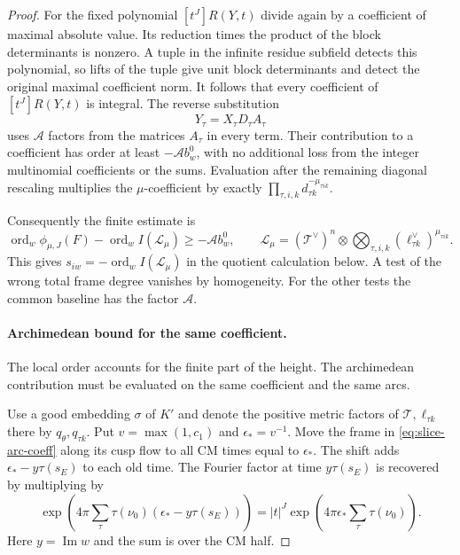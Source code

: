 \begin{proof}
For the fixed polynomial \([t^J]R(Y,t)\) divide again by a
coefficient of maximal absolute value. Its reduction times
the product of the block determinants is nonzero. A tuple
in the infinite residue subfield detects this polynomial,
so lifts of the tuple give unit block determinants and
detect the original maximal coefficient norm. It follows
that every coefficient of \([t^J]R(Y,t)\) is integral.
The reverse substitution 
\[
  Y_\tau=X_\tau D_\tau A_\tau
\]
uses \(\mathcal A\) factors from the matrices \(A_\tau\)
in every term. Their contribution to a coefficient has
order at least \(-\mathcal A b_w^0\), with no additional
loss from the integer multinomial coefficients or the sums.
Evaluation after the remaining diagonal rescaling multiplies
the \(\mu\)-coefficient by exactly
\(\prod_{\tau,i,k}d_{\tau k}^{-\mu_{\tau i k}}\).

Consequently the finite estimate is
\[
 \operatorname{ord}_w\phi_{\mu,J}(F)-
       \operatorname{ord}_w I(\mathcal L_\mu)
       \ge-\mathcal A b_w^0,
 \qquad
 \mathcal L_\mu=(\mathcal T^\vee)^n
                  \otimes\bigotimes_{\tau,i,k}
                         (\ell_{\tau k}^\vee)^{\mu_{\tau i k}}.
\]
This gives \(s_{iw}=-\operatorname{ord}_w I(\mathcal L_\mu)\)
in the quotient calculation below. A test of the wrong
total frame degree vanishes by homogeneity. For the other
tests the common baseline has the factor \(\mathcal A\).
\label{cor:slice-cm-coefficients-5}

\paragraph{Archimedean bound for the same coefficient.}

The local order accounts for the finite part of the height. The archimedean contribution must be evaluated on the same coefficient and the same arcs.

Use a good embedding \(\sigma\) of \(K'\) and denote the
positive metric factors of \(\mathcal T,\ell_{\tau k}\) there
by \(q_\theta,q_{\tau k}\). Put \(v=\max(1,c_1)\) and
\(\epsilon_*=v^{-1}\). Move the frame in
\eqref{eq:slice-arc-coeff} along its cusp flow to all CM
times equal to \(\epsilon_*\). The shift adds
\(\epsilon_*-y\tau(s_E)\) to each old time. The Fourier
factor at time \(y\tau(s_E)\) is recovered by multiplying by
\[
 \exp\left(4\pi\sum_{\tau}\tau(\nu_0)
                         (\epsilon_*-y\tau(s_E))\right)
 = |t|^J\exp\left(4\pi\epsilon_*\sum_\tau\tau(\nu_0)\right).
\]
Here \(y=\operatorname{Im}w\) and the sum is over the CM half.


\end{proof}

